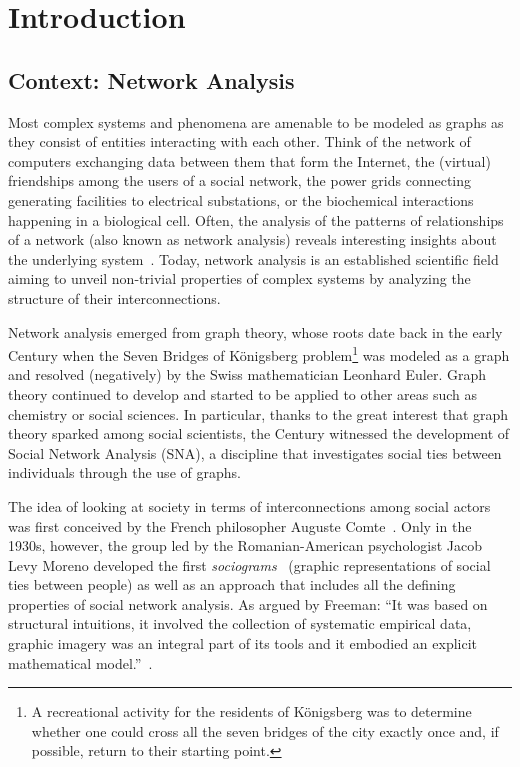 \chapter{Introduction}

\section{Context: Network Analysis}
\label{sec:intro:context}

Most complex systems and phenomena are amenable to be modeled as graphs as they
consist of entities interacting with each other.
%
Think of the network of computers exchanging data between them that form the
Internet, the (virtual) friendships among the users of a social network, the
power grids connecting generating facilities to electrical substations, or the
biochemical interactions happening in a biological cell.
Often, the analysis of the patterns of relationships of a network
(also known as network analysis) reveals interesting insights about the
underlying system~\cite{DBLP:conf/cscw/BackstromK14,
DBLP:conf/dsc/ZuoZ16,tang2012inferring,lambiotte2008geographical}.
Today, network analysis is an established scientific field aiming to unveil
non-trivial properties of complex systems by analyzing the structure of their
interconnections.

Network analysis emerged from graph theory, whose roots date back in the early
 Century when the Seven Bridges of K\"onigsberg
problem\footnote{A recreational activity for the residents of K\"onigsberg was
to determine whether one could cross all the seven bridges of the city exactly
once and, if possible, return to their starting point.} was modeled as a graph
and resolved (negatively) by the Swiss mathematician Leonhard Euler.
Graph theory continued to develop and started to be applied to other areas
such as chemistry or social sciences.
In particular, thanks to the great interest that graph theory sparked among social
scientists, the  Century witnessed the development of Social Network
Analysis (SNA), a discipline that investigates social ties between individuals
through the use of graphs.

The idea of looking at society in terms of interconnections among
social actors was first conceived by the French philosopher Auguste Comte~\cite[p.
14]{DBLP:journals/socnet/Bernard05}. Only in the 1930s, however, the group led
by the Romanian-American psychologist Jacob Levy Moreno developed the first
\emph{sociograms}~\cite{moreno1934shall} (\ie graphic representations of social
ties between people) as well as an approach that includes all the defining
properties of social network analysis. As argued by Freeman: \enquote{It was
based on structural intuitions, it involved the collection of systematic
empirical data, graphic imagery was an integral part of its tools and it
embodied an explicit mathematical model.}~\cite[p. 39]{DBLP:journals/socnet/Bernard05}.

